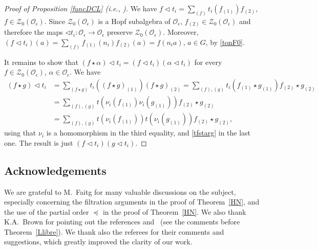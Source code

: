 \documentclass[10pt,a4paper]{amsart}
\numberwithin{equation}{section}
\theoremstyle{definition}
\newcommand{\e}{\epsilon}
\newcommand{\Oo}{{\mathcal O}}
\newcommand{\ra}{\rightarrow}
\begin{document}
\begin{proof}[Proof of Proposition \ref{funcDCL} (i.e., {\cite[Proposition 7.1]{DC-L}})] We have $ f\lhd t_i = \sum_{(f)} t_i(f_{(1)})f_{(2)}$, $f\in \mathcal{Z}_0(\Oo_\e)$. Since $\mathcal{Z}_0(\Oo_\e)$ is a Hopf subalgebra of ${\mathcal O}_{\epsilon}$, $f_{(2)} \in \mathcal{Z}_0(\Oo_\e)$ and therefore the maps $\lhd t_i\colon \Oo_\e \ra \Oo_\e$ preserve $\mathcal{Z}_0(\Oo_\e)$. Moreover, $ (f\lhd t_i)(a) = \sum_{(f)} f_{(1)}(n_i)f_{(2)}(a) = f(n_ia)$, $a\in G$, by \eqref{tonF0}.

It remains to show that $(f\star \alpha)\lhd t_i = (f\lhd t_i)(\alpha\lhd t_i)$ for every $f\in \mathcal{Z}_0(\Oo_\e)$, $\alpha\in \mathcal{O}_\e$. We have
\begin{align}
 (f\star g)\lhd t_i &= \sum_{(f\star g)} t_i\left((f\star g)_{(1)}\right)(f\star g)_{(2)}= \sum_{(f),(g)} t_i\left(f_{(1)}\star g_{(1)}\right)f_{(2)}\star g_{(2)}\nonumber\\ & = \sum_{(f),(g)} t\left(\nu_i(f_{(1)})\nu_i(g_{(1)})\right)f_{(2)}\star g_{(2)}\nonumber\\
& =\sum_{(f),(g)} t\left(\nu_i(f_{(1)})\right)t\left(\nu_i(g_{(1)})\right)f_{(2)}\star g_{(2)},\label{fundrelt}
\end{align}
using that $\nu_i$ is a homomorphism in the third equality, and \eqref{tfstarg} in the last one. The result is just $(f\lhd t_i)(g\lhd t_i)$.
\end{proof}


\subsection*{Acknowledgements}We are grateful to M.~Faitg for many valuable discussions on the subject, especially concerning the filtration arguments in the proof of Theorem~\ref{HN}, and the use of the partial order $\preceq$ in the proof of Theorem~\ref{HN}. We also thank K.A.~Brown for pointing out the references \cite{AnGa} and~\cite{BC} (see the comments before Theorem~\ref{Llibre}). We thank also the referees for their comments and suggestions, which greatly improved the clarity of our work.

\end{document}
